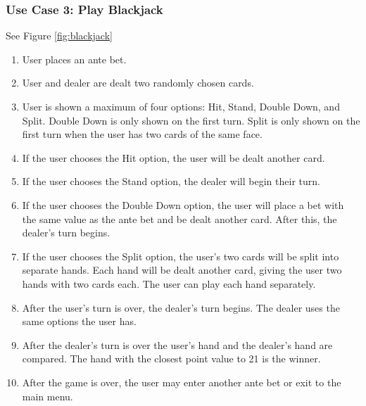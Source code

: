 \documentclass[10pt,conference,onecolumn,compsoc]{IEEEtran}
\begin{document}
\subsubsection{Use Case 3: Play Blackjack}
See Figure \ref{fig:blackjack}
\begin{enumerate}
\item User places an ante bet.
\item User and dealer are dealt two randomly chosen cards. 
\item User is shown a maximum of four options: Hit, Stand, Double Down, and Split. Double Down is only shown on the first turn. Split is only shown on the first turn when the user has two cards of the same face.
\item If the user chooses the Hit option, the user will be dealt another card.
\item If the user chooses the Stand option, the dealer will begin their turn.
\item If the user chooses the Double Down option, the user will place a bet with the same value as the ante bet and be dealt another card. After this, the dealer's turn begins.
\item If the user chooses the Split option, the user's two cards will be split into separate hands. Each hand will be dealt another card, giving the user two hands with two cards each. The user can play each hand separately.
\item After the user's turn is over, the dealer's turn begins. The dealer uses the same options the user has.
\item After the dealer's turn is over the user's hand and the dealer's hand are compared. The hand with the closest point value to 21 is the winner.
\item After the game is over, the user may enter another ante bet or exit to the main menu.
\end{enumerate}
\end{document}
